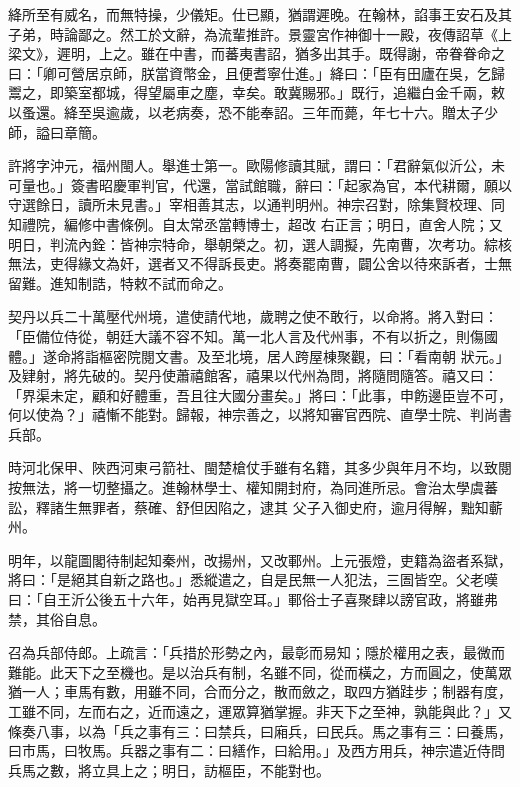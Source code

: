 \begin{pinyinscope}
 絳所至有威名，而無特操，少儀矩。仕已顯，猶謂遲晚。在翰林，諂事王安石及其子弟，時論鄙之。然工於文辭，為流輩推許。景靈宮作神御十一殿，夜傳詔草《上梁文》，遲明，上之。雖在中書，而蕃夷書詔，猶多出其手。既得謝，帝眷眷命之曰：「卿可營居京師，朕當資幣金，且便耆寧仕進。」絳曰：「臣有田廬在吳，乞歸
 鬻之，即築室都城，得望屬車之塵，幸矣。敢冀賜邪。」既行，追繼白金千兩，敕以蚤還。絳至吳逾歲，以老病奏，恐不能奉詔。三年而薨，年七十六。贈太子少師，謚曰章簡。



 許將字沖元，福州閩人。舉進士第一。歐陽修讀其賦，謂曰：「君辭氣似沂公，未可量也。」簽書昭慶軍判官，代還，當試館職，辭曰：「起家為官，本代耕爾，願以守選餘日，讀所未見書。」宰相善其志，以通判明州。神宗召對，除集賢校理、同知禮院，編修中書條例。自太常丞當轉博士，超改
 右正言；明日，直舍人院；又明日，判流內銓：皆神宗特命，舉朝榮之。初，選人調擬，先南曹，次考功。綜核無法，吏得緣文為奸，選者又不得訴長吏。將奏罷南曹，闢公舍以待來訴者，士無留難。進知制誥，特敕不試而命之。



 契丹以兵二十萬壓代州境，遣使請代地，歲聘之使不敢行，以命將。將入對曰：「臣備位侍從，朝廷大議不容不知。萬一北人言及代州事，不有以折之，則傷國體。」遂命將詣樞密院閱文書。及至北境，居人跨屋棟聚觀，曰：「看南朝
 狀元。」及肄射，將先破的。契丹使蕭禧館客，禧果以代州為問，將隨問隨答。禧又曰：「界渠未定，顧和好體重，吾且往大國分畫矣。」將曰：「此事，申飭邊臣豈不可，何以使為？」禧慚不能對。歸報，神宗善之，以將知審官西院、直學士院、判尚書兵部。



 時河北保甲、陜西河東弓箭社、閩楚槍仗手雖有名籍，其多少與年月不均，以致閱按無法，將一切整攝之。進翰林學士、權知開封府，為同進所忌。會治太學虞蕃訟，釋諸生無罪者，蔡確、舒但因陷之，逮其
 父子入御史府，逾月得解，黜知蘄州。



 明年，以龍圖閣待制起知秦州，改揚州，又改鄆州。上元張燈，吏籍為盜者系獄，將曰：「是絕其自新之路也。」悉縱遣之，自是民無一人犯法，三圄皆空。父老嘆曰：「自王沂公後五十六年，始再見獄空耳。」鄆俗士子喜聚肆以謗官政，將雖弗禁，其俗自息。



 召為兵部侍郎。上疏言：「兵措於形勢之內，最彰而易知；隱於權用之表，最微而難能。此天下之至機也。是以治兵有制，名雖不同，從而橫之，方而圓之，使萬眾
 猶一人；車馬有數，用雖不同，合而分之，散而斂之，取四方猶跬步；制器有度，工雖不同，左而右之，近而遠之，運眾算猶掌握。非天下之至神，孰能與此？」又條奏八事，以為「兵之事有三：曰禁兵，曰廂兵，曰民兵。馬之事有三：曰養馬，曰市馬，曰牧馬。兵器之事有二：曰繕作，曰給用。」及西方用兵，神宗遣近侍問兵馬之數，將立具上之；明日，訪樞臣，不能對也。




\end{pinyinscope}
